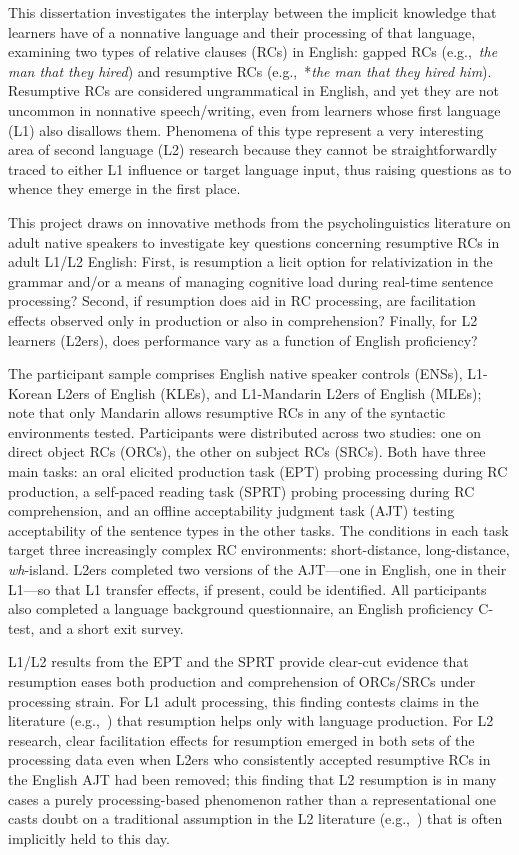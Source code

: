 This dissertation investigates the interplay between the implicit knowledge that learners have of a nonnative language and their processing of that language, examining two types of relative clauses (RCs) in English: gapped RCs (e.g.,~\textit{the man that they hired}) and resumptive RCs (e.g.,~*\textit{the man that they hired him}). Resumptive RCs are considered ungrammatical in English, and yet they are not uncommon in nonnative speech/writing, even from learners whose first language (L1) also disallows them. Phenomena of this type represent a very interesting area of second language (L2) research because they cannot be straightforwardly traced to either L1 influence or target language input, thus raising questions as to whence they emerge in the first place.

This project draws on innovative methods from the psycholinguistics literature on adult native speakers to investigate key questions concerning resumptive RCs in adult L1/L2 English: First, is resumption a licit option for relativization in the grammar and/or a means of managing cognitive load during real-time sentence processing? Second, if resumption does aid in RC processing, are facilitation effects observed only in production or also in comprehension? Finally, for L2 learners (L2ers), does performance vary as a function of English proficiency?

The participant sample comprises English native speaker controls (ENSs), L1-Korean L2ers of English (KLEs), and L1-Mandarin L2ers of English (MLEs); note that only Mandarin allows resumptive RCs in any of the syntactic environments tested. Participants were distributed across two studies: one on direct object RCs (ORCs), the other on subject RCs (SRCs). Both have three main tasks: an oral elicited production task (EPT) probing processing during RC production, a self-paced reading task (SPRT) probing processing during RC comprehension, and an offline acceptability judgment task (AJT) testing acceptability of the sentence types in the other tasks. The conditions in each task target three increasingly complex RC environments: short-distance, long-distance, \textit{wh}-island. L2ers completed two versions of the AJT---one in English, one in their L1---so that L1 transfer effects, if present, could be identified. All participants also completed a language background questionnaire, an English proficiency C-test, and a short exit survey.

L1/L2 results from the EPT and the SPRT provide clear-cut evidence that resumption eases both production and comprehension of ORCs/SRCs under processing strain. For L1 adult processing, this finding contests claims in the literature (e.g.,~\cite{ferreira.swets2005}) that resumption helps only with language production. For L2 research, clear facilitation effects for resumption emerged in both sets of the processing data even when L2ers who consistently accepted resumptive RCs in the English AJT had been removed; this finding that L2 resumption is in many cases a purely processing-based phenomenon rather than a representational one casts doubt on a traditional assumption in the L2 literature (e.g.,~\cite{hyltenstam1984}) that is often implicitly held to this day.

